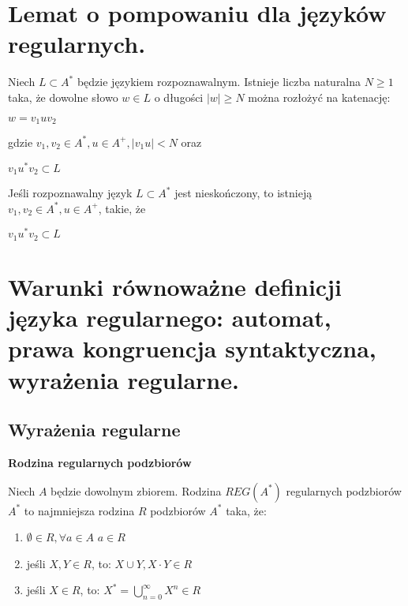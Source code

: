 \documentclass[main.tex]{subfiles}
\begin{document}
    \section{Lemat o pompowaniu dla języków regularnych.}
    \begin{definition}
        Niech $L \subset A^*$ będzie językiem rozpoznawalnym. Istnieje liczba naturalna $N \geq 1$ taka, że dowolne słowo $w \in L$ o długości $|w| \geq N$ można rozłożyć na katenację:
        \begin{center}
            $w = v_1 u v_2$
        \end{center}
        gdzie $v_1, v_2 \in A^*, u \in A^+, |v_1 u| < N$ oraz
        \begin{center}
            $v_1 u^* v_2 \subset L$
        \end{center}
    \end{definition}

    \begin{definition}
        Jeśli rozpoznawalny język $L \subset A^*$ jest nieskończony, to istnieją
        $v_1, v_2 \in A^*, u \in A^+$, takie, że
        \begin{center}
            $v_1 u^* v_2 \subset L$
        \end{center}
    \end{definition}

    \newpage

    \section{Warunki równoważne definicji języka regularnego: automat, prawa kongruencja syntaktyczna, wyrażenia regularne.}
    \subsection{Wyrażenia regularne}

    \begin{definition}
        \textbf{Rodzina regularnych podzbiorów}

        Niech $A$ będzie dowolnym zbiorem. Rodzina $REG(A^*)$ regularnych podzbiorów
        $A^*$ to najmniejsza rodzina $R$ podzbiorów $A^*$ taka, że:

        \begin{enumerate}
            \item $\emptyset \in R, \forall a \in A$ ${a} \in R$
            \item jeśli $X, Y \in R$, to: $X \cup Y, X \cdot Y \in R$
            \item jeśli $X \in R$, to: $X^* = \bigcup\limits_{n = 0}^{\infty} X^n \in R$
        \end{enumerate}
    \end{definition}
\end{document}
